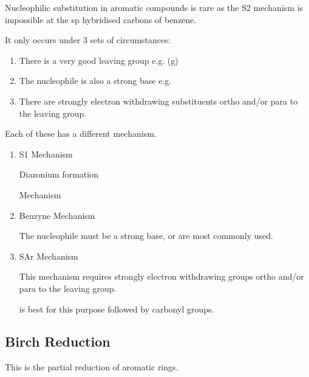 Nucleophilic substitution in aromatic compounds is rare as the S2 mechanism is impossible at the sp hybridised carbons of benzene.


It only occurs under 3 sets of circumstances:
\begin{enumerate}
  \item There is a very good leaving group e.g.  (g)
  \item The nucleophile is also a strong base e.g. 
  \item There are strongly electron withdrawing substituents ortho and/or para to the leaving group.
\end{enumerate}

Each of these has a different mechanism.

\begin{enumerate}[label=\alph*)]
  \item S1 Mechanism


    Diazonium formation


    Mechanism


  \item Benzyne Mechanism


    The nucleophile must be a strong base,  or  are most commonly used.

  \item SAr Mechanism


    This mechanism requires strongly electron withdrawing groups ortho and/or para to the leaving group.

     is best for this purpose followed by carbonyl groups.


\end{enumerate}

\subsection{Birch Reduction}

This is the partial reduction of aromatic rings.

